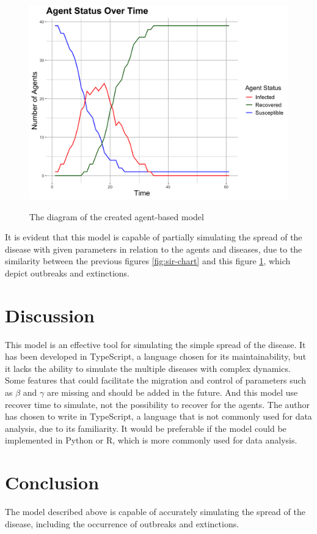 \documentclass[12pt]{article}
\begin{document}
\begin{figure}[ht]
	\centering
	\includegraphics[width=0.9\linewidth]{./assets/report-20246030-132911/diagram.png}
    \label{fig:agent-based-model-chart} 
	\caption{\scriptsize \sffamily The diagram of the created agent-based model}
\end{figure}

It is evident that this model is capable of partially simulating the spread of the disease with given parameters in relation to the agents and diseases, due to the similarity between the previous figures \ref{fig:sir-chart} and this figure \ref{fig:agent-based-model-chart}, which depict outbreaks and extinctions.

\section{Discussion}
This model is an effective tool for simulating the simple spread of the disease. It has been developed in TypeScript, a language chosen for its maintainability, but it lacks the ability to simulate the multiple diseases with complex dynamics. Some features that could facilitate the migration and control of parameters such as $\beta$ and $\gamma$ are missing and should be added in the future. And this model use recover time to simulate, not the possibility to recover for the agents. The author has chosen to write in TypeScript, a language that is not commonly used for data analysis, due to its familiarity. It would be preferable if the model could be implemented in Python or R, which is more commonly used for data analysis.

\section{Conclusion}
The model described above is capable of accurately simulating the spread of the disease, including the occurrence of outbreaks and extinctions.
\end{document}
